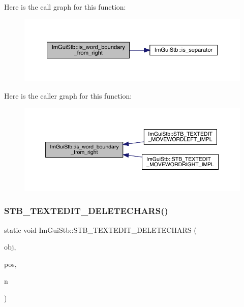 Here is the call graph for this function\+:
\nopagebreak
\begin{figure}[H]
\begin{center}
\leavevmode
\includegraphics[width=350pt]{dc/d59/namespace_im_gui_stb_a4e3d14415639a57b7d77dfedfa91b8f7_cgraph}
\end{center}
\end{figure}
Here is the caller graph for this function\+:
\nopagebreak
\begin{figure}[H]
\begin{center}
\leavevmode
\includegraphics[width=350pt]{dc/d59/namespace_im_gui_stb_a4e3d14415639a57b7d77dfedfa91b8f7_icgraph}
\end{center}
\end{figure}
\mbox{\label{namespace_im_gui_stb_aa8e93b4c0311ac9f020fdd26d2652596}} 
\subsubsection{\texorpdfstring{S\+T\+B\+\_\+\+T\+E\+X\+T\+E\+D\+I\+T\+\_\+\+D\+E\+L\+E\+T\+E\+C\+H\+A\+R\+S()}{STB\_TEXTEDIT\_DELETECHARS()}}
{\footnotesize\ttfamily static void Im\+Gui\+Stb\+::\+S\+T\+B\+\_\+\+T\+E\+X\+T\+E\+D\+I\+T\+\_\+\+D\+E\+L\+E\+T\+E\+C\+H\+A\+RS (\begin{DoxyParamCaption}\item[{S\+T\+B\+\_\+\+T\+E\+X\+T\+E\+D\+I\+T\+\_\+\+S\+T\+R\+I\+NG $\ast$}]{obj,  }\item[{int}]{pos,  }\item[{int}]{n }\end{DoxyParamCaption})\hspace{0.3cm}{\ttfamily [static]}}


